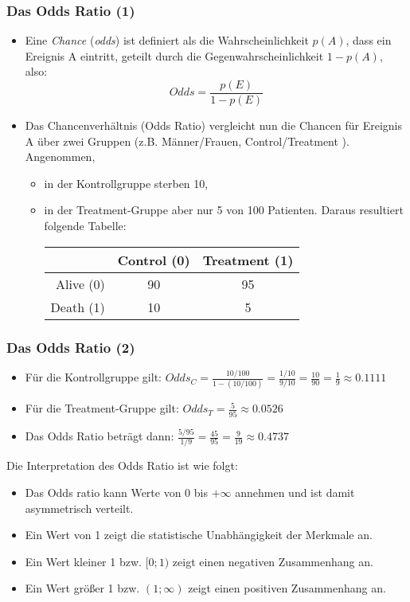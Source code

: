 \begin{frame}\frametitle{Das Odds Ratio (1)}
  \begin{itemize}
  \item Eine \emph{Chance} (\emph{odds}) ist definiert als die
    Wahrscheinlichkeit $p(A)$, dass ein Ereignis A eintritt, geteilt durch die
    Gegenwahrscheinlichkeit $1-p(A)$, also:
    \begin{equation}
      Odds = \frac{p(E)}{1-p(E)}
    \end{equation}
  \item Das Chancenverhältnis (Odds Ratio) vergleicht nun die Chancen für Ereignis A über
    zwei Gruppen (z.B. Männer/Frauen, Control/Treatment ). Angenommen,
    \begin{itemize}
    \item in der Kontrollgruppe sterben 10,
    \item in der Treatment-Gruppe aber nur 5 von 100 Patienten. Daraus resultiert folgende Tabelle:
      \begin{tabular}{|r|c|c|}
        \hline
        & Control (0) & Treatment (1) \\
        \hline
        Alive (0) & 90    & 95    \\
        Death (1) & 10    & 5     \\
        \hline
      \end{tabular}
      \end{itemize}   
  \end{itemize}
\end{frame}


\begin{frame}\frametitle{Das Odds Ratio (2)}
  \begin{itemize}
  \item Für die Kontrollgruppe gilt: $Odds_C = \frac{10/100}{1 - (10/100)} = \frac{1/10}{9/10} = \frac{10}{90} = \frac{1}{9} \approx 0.1111$
  \item Für die Treatment-Gruppe gilt: $Odds_T = \frac{5}{95} \approx 0.0526$
  \item Das Odds Ratio beträgt dann: $\frac{5/95}{1/9}=\frac{45}{95} = \frac{9}{19} \approx 0.4737$
  \end{itemize}

  Die Interpretation des Odds Ratio ist wie folgt:
  \begin{itemize}
  \item Das Odds ratio kann Werte von 0 bis $+\infty$ annehmen und ist damit asymmetrisch verteilt.
  \item Ein Wert von 1 zeigt die statistische Unabhängigkeit der Merkmale an.
  \item Ein Wert kleiner 1 bzw. $[0;1)$ zeigt einen negativen Zusammenhang an.
  \item Ein Wert größer 1 bzw. $(1; \infty)$ zeigt einen positiven Zusammenhang an.
  \end{itemize}
\end{frame}
    


